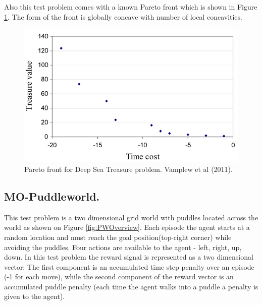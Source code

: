 Also this test problem comes with a known Pareto front which is shown in Figure \ref{fig:DSTFront}. The form of the front is globally concave with number of local concavities.

\begin{figure}[ht]
\vskip 0.2in
\centering
\includegraphics[scale=0.9]{dstPareto.png}
\caption{Pareto front for Deep Sea Treasure problem. Vamplew et al (2011).}
\label{fig:DSTFront}
\end{figure}

\subsection{MO-Puddleworld.}
This test problem is a two dimensional grid world with puddles located across the world as shown on Figure \ref{fig:PWOverview}. Each episode the agent starts at a random location and must reach the goal position(top-right corner) while avoiding the puddles. Four actions are available to the agent - left, right, up, down. In this test problem the reward signal is represented as a two dimensional vector; The first component is an accumulated time step penalty over an episode (-1 for each move), while the second component of the reward vector is an accumulated puddle penalty (each time the agent walks into a puddle a penalty is given to the agent).

